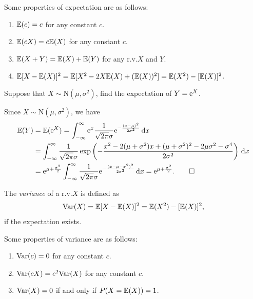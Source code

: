 \begin{proposition}
  Some properties of expectation are as follows:
  \begin{enumerate}
    \item \(\mathbb{E}(c) = c\) for any constant \(c\).
    \item \(\mathbb{E}(cX) = c \mathbb{E}(X)\) for any constant \(c\).
    \item \(\mathbb{E}(X + Y) = \mathbb{E}(X) + \mathbb{E}(Y)\) for any r.v.\@ \(X\) and \(Y\).
    \item \(\mathbb{E}[X - \mathbb{E}(X)]^2 = \mathbb{E}[X^2 - 2X\mathbb{E}(X) + (\mathbb{E}(X))^2] = \mathbb{E}(X^2) - [\mathbb{E}(X)]^2\).
  \end{enumerate}
\end{proposition}

\begin{example}
  Suppose that \(X \sim \mathrm{N}(\mu, \sigma^2)\), find the expectation of \(Y = \mathrm{e}^X\).
\end{example}
\begin{solution}
  Since \(X \sim \mathrm{N}(\mu, \sigma^2)\), we have
  \begin{align*}
    \mathbb{E}(Y) & = \mathbb{E}(\mathrm{e}^X) = \int_{-\infty}^\infty \mathrm{e}^x \frac{1}{\sqrt{2\mathrm{\pi}} \sigma} \mathrm{e}^{-\frac{(x - \mu)^2}{2\sigma^2}}\,\mathrm{d} x \\
    & = \int_{-\infty}^\infty \frac{1}{\sqrt{2\mathrm{\pi}} \sigma} \exp\left(-\frac{x^2 -2(\mu + \sigma^2)x + (\mu + \sigma^2)^2 - 2\mu\sigma^2 - \sigma^4}{2\sigma^2}\right)\,\mathrm{d} x \\
    & = \mathrm{e}^{\mu + \frac{\sigma^2}{2}} \int_{-\infty}^\infty \frac{1}{\sqrt{2\mathrm{\pi}} \sigma} \mathrm{e}^{-\frac{(x - \mu - \sigma^2)^2}{2\sigma^2}}\,\mathrm{d} x = \mathrm{e}^{\mu + \frac{\sigma^2}{2}}. \qedhere
  \end{align*}
\end{solution}

\begin{definition}[Variance]
  The \emph{variance} of a r.v.\@ \(X\) is defined as
  \[
    \mathrm{Var}(X) = \mathbb{E}[X - \mathbb{E}(X)]^2 = \mathbb{E}(X^2) - [\mathbb{E}(X)]^2,
  \]
  if the expectation exists.
\end{definition}

\begin{proposition}
  Some properties of variance are as follows:
  \begin{enumerate}
    \item \(\mathrm{Var}(c) = 0\) for any constant \(c\).
    \item \(\mathrm{Var}(cX) = c^2 \mathrm{Var}(X)\) for any constant \(c\).
    \item \(\mathrm{Var}(X) = 0\) if and only if \(P(X = \mathbb{E}(X)) = 1\).
  \end{enumerate}
\end{proposition}

